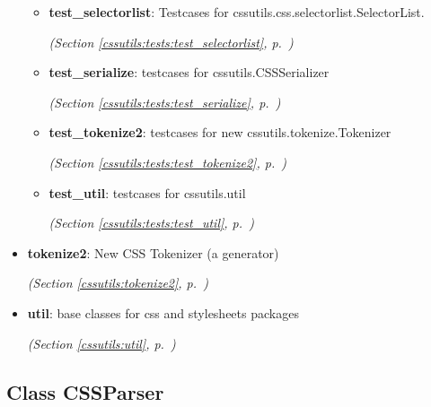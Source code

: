 \begin{itemize}
\begin{itemize}
    \item \textbf{test\_selectorlist}: Testcases for cssutils.css.selectorlist.SelectorList.



  \textit{(Section \ref{cssutils:tests:test_selectorlist}, p.~\pageref{cssutils:tests:test_selectorlist})}

    \item \textbf{test\_serialize}: testcases for cssutils.CSSSerializer



  \textit{(Section \ref{cssutils:tests:test_serialize}, p.~\pageref{cssutils:tests:test_serialize})}

    \item \textbf{test\_tokenize2}: testcases for new cssutils.tokenize.Tokenizer



  \textit{(Section \ref{cssutils:tests:test_tokenize2}, p.~\pageref{cssutils:tests:test_tokenize2})}

    \item \textbf{test\_util}: testcases for cssutils.util



  \textit{(Section \ref{cssutils:tests:test_util}, p.~\pageref{cssutils:tests:test_util})}

  \end{itemize}
\item \textbf{tokenize2}: 
New CSS Tokenizer (a generator)


  \textit{(Section \ref{cssutils:tokenize2}, p.~\pageref{cssutils:tokenize2})}

\item \textbf{util}: 
base classes for css and stylesheets packages


  \textit{(Section \ref{cssutils:util}, p.~\pageref{cssutils:util})}

\end{itemize}



\subsection{Class CSSParser}


